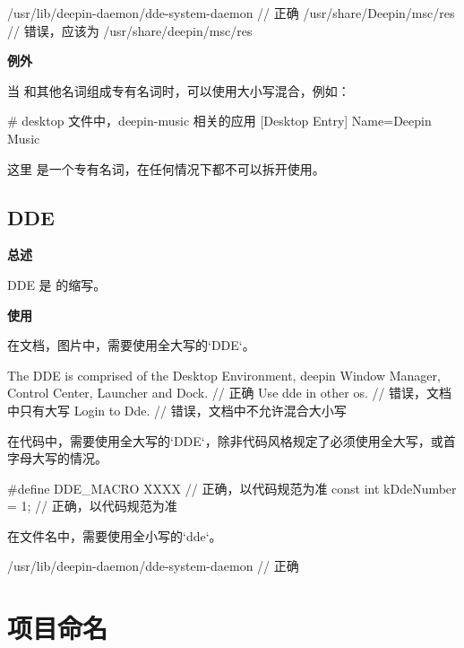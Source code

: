 \begin{cppcode}
  /usr/lib/deepin-daemon/dde-system-daemon  // 正确
  /usr/share/Deepin/msc/res                 // 错误，应该为 /usr/share/deepin/msc/res
\end{cppcode}

\textbf{例外}

当 \deepin 和其他名词组成专有名词时，可以使用大小写混合，例如：

\begin{inicode}
  # desktop 文件中，deepin-music 相关的应用
  [Desktop Entry]
  Name=Deepin Music
\end{inicode}

这里 是一个专有名词，在任何情况下都不可以拆开使用。

\subsection{DDE}

\textbf{总述}

DDE 是  的缩写。


\textbf{使用}

在文档，图片中，需要使用全大写的`DDE`。

\begin{cppcode}
  The DDE is comprised of the Desktop Environment, deepin Window Manager, Control Center, Launcher and Dock.    // 正确
  Use dde in other os.                  // 错误，文档中只有大写
  Login to Dde.                         // 错误，文档中不允许混合大小写
\end{cppcode}

在代码中，需要使用全大写的`DDE`，除非代码风格规定了必须使用全大写，或首字母大写的情况。

\begin{cppcode}
  #define DDE_MACRO XXXX     // 正确，以代码规范为准
  const int kDdeNumber = 1;  // 正确，以代码规范为准
\end{cppcode}

在文件名中，需要使用全小写的`dde`。

\begin{cppcode}
  /usr/lib/deepin-daemon/dde-system-daemon  // 正确
\end{cppcode}

\section{项目命名} \label{deepin-project-naming}

